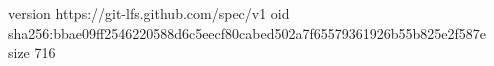 version https://git-lfs.github.com/spec/v1
oid sha256:bbae09ff2546220588d6c5eecf80cabed502a7f65579361926b55b825e2f587e
size 716
